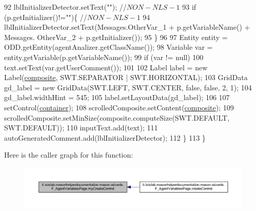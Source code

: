 \begin{DoxyCode}
92             lblInitializerDetector.setText(\textcolor{stringliteral}{""}); \textcolor{comment}{//$NON-NLS-1$}
93             \textcolor{keywordflow}{if} (p.getInitializer()!=\textcolor{stringliteral}{""})\{ \textcolor{comment}{//$NON-NLS-1$}
94                 lblInitializerDetector.setText(Messages.OtherVar\_1 + p.getVariableName() + Messages.
      OtherVar\_2 + p.getInitializer());
95             \}
96             
97             Entity entity = ODD.getEntity(agentAnalizer.getClassName());
98             Variable var = entity.getVariable(p.getVariableName());
99             \textcolor{keywordflow}{if} (var != null)
100                 text.setText(var.getUserComment());
101             
102             Label label = \textcolor{keyword}{new} Label(\hyperlink{classit_1_1isislab_1_1masonhelperdocumentation_1_1mason_1_1wizards_1_1_f___agent_variables_page_a9b95e0b06f6e0d96b7497478df0e5960}{composite}, SWT.SEPARATOR | SWT.HORIZONTAL);
103             GridData gd\_label = \textcolor{keyword}{new} GridData(SWT.LEFT, SWT.CENTER, \textcolor{keyword}{false}, \textcolor{keyword}{false}, 2, 1);
104             gd\_label.widthHint = 545;
105             label.setLayoutData(gd\_label);
106             
107             setControl(\hyperlink{classit_1_1isislab_1_1masonhelperdocumentation_1_1mason_1_1wizards_1_1_f___agent_variables_page_aa9f4b2d9a3bfc361d12d8832f8f7e212}{container});
108             scrolledComposite.setContent(\hyperlink{classit_1_1isislab_1_1masonhelperdocumentation_1_1mason_1_1wizards_1_1_f___agent_variables_page_a9b95e0b06f6e0d96b7497478df0e5960}{composite});
109             scrolledComposite.setMinSize(composite.computeSize(SWT.DEFAULT, SWT.DEFAULT));  
110             inputText.add(text);
111             autoGeneratedComment.add(lblInitializerDetector);
112         \}
113     \}
\end{DoxyCode}


Here is the caller graph for this function\-:\nopagebreak
\begin{figure}[H]
\begin{center}
\leavevmode
\includegraphics[width=350pt]{classit_1_1isislab_1_1masonhelperdocumentation_1_1mason_1_1wizards_1_1_f___agent_variables_page_a182a280459538ed143e8cd15904dd7c3_icgraph}
\end{center}
\end{figure}




